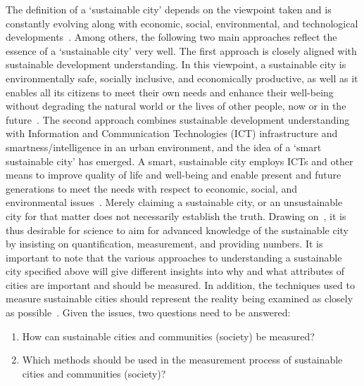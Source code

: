 \documentclass[5p,times]{elsarticle}
\begin{document}
The definition of a ‘sustainable city’ depends on the viewpoint taken and is constantly evolving along with economic, social, environmental, and technological developments~\cite{itu2014}. Among others, the following two main approaches reflect the essence of a ‘sustainable city’ very well. The first approach is closely aligned with sustainable development understanding. In this viewpoint, a sustainable city is environmentally safe, socially inclusive, and economically productive, as well as it enables all its citizens to meet their own needs and enhance their well-being without degrading the natural world or the lives of other people, now or in the future~\cite{koh2010eco, un2009}. The second approach combines sustainable development understanding with Information and Communication Technologies (ICT) infrastructure and smartness/intelligence in an urban environment, and the idea of a ‘smart sustainable city’ has emerged. A smart, sustainable city employs ICTs and other means to improve quality of life and well-being and enable present and future generations to meet the needs with respect to economic, social, and environmental issues~\cite{itu2014, hojer2015smart}. 
Merely claiming a sustainable city, or an unsustainable city for that matter does not necessarily establish the truth. Drawing on~\cite{subhas2020measures}, it is thus desirable for science to aim for advanced knowledge of the sustainable city by insisting on quantification, measurement, and providing numbers. It is important to note that the various approaches to understanding a sustainable city specified above will give different insights into why and what attributes of cities are important and should be measured. In addition, the techniques used to measure sustainable cities should represent the reality being examined as closely as possible~\cite{reis2019evaluation}. Given the issues, two questions need to be answered:

\begin{enumerate}
    \item {How can sustainable cities and communities (society) be measured?}
    \item {Which methods should be used in the measurement process of sustainable cities and communities (society)?}
\end{enumerate}
\end{document}
